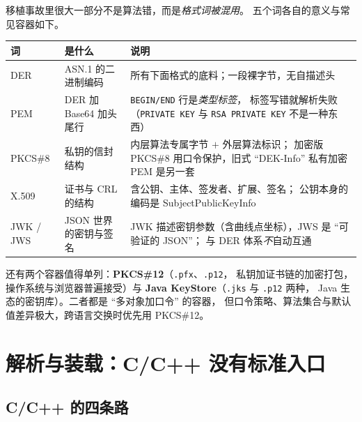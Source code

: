 \documentclass[12pt,a4paper,fontset=fandol]{ctexbook}
\newcommand{\Tp}[1]{\texttt{#1}}
\newcommand{\CppJava}{C/C++}
\begin{document}
移植事故里很大一部分不是算法错，而是\emph{格式词被混用}。
五个词各自的意义与常见容器如下。

\begin{footnotesize}
\begin{longtable}{@{}>{\raggedright\arraybackslash}p{}
                  >{\raggedright\arraybackslash}p{}
                  >{\raggedright\arraybackslash}p{}@{}}
\toprule
\textbf{词} & \textbf{是什么} & \textbf{说明} \\
\midrule
DER & ASN.1 的二进制编码 &
所有下面格式的底料；一段裸字节，无自描述头 \\
\addlinespace
PEM & DER 加 Base64 加头尾行 &
\texttt{BEGIN/END} 行是\emph{类型标签}，
标签写错就解析失败（\texttt{PRIVATE KEY} 与
\texttt{RSA PRIVATE KEY} 不是一种东西） \\
\addlinespace
PKCS\#8 & 私钥的信封结构 &
内层算法专属字节 $+$ 外层算法标识；
加密版 PKCS\#8 用口令保护，旧式 ``DEK-Info'' 私有加密 PEM 是另一套 \\
\addlinespace
X.509 & 证书与 CRL 的结构 &
含公钥、主体、签发者、扩展、签名；
公钥本身的编码是 SubjectPublicKeyInfo \\
\addlinespace
JWK / JWS & JSON 世界的密钥与签名 &
JWK 描述密钥参数（含曲线点坐标），JWS 是 ``可验证的 JSON''；
与 DER 体系\emph{不}自动互通 \\
\bottomrule
\end{longtable}
\end{footnotesize}

还有两个容器值得单列：\textbf{PKCS\#12}（\Tp{.pfx}、\Tp{.p12}，
私钥加证书链的加密打包，操作系统与浏览器普遍接受）与
\textbf{Java KeyStore}（\Tp{.jks} 与 \Tp{.p12} 两种，
Java 生态的密钥库）。二者都是 ``多对象加口令'' 的容器，
但口令策略、算法集合与默认值差异极大，跨语言交换时优先用 PKCS\#12。

\section{解析与装载：\CppJava{} 没有标准入口}

\subsection{\CppJava{} 的四条路}
\end{document}
